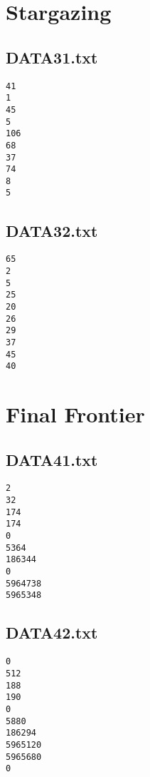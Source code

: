 \documentclass{article}
\begin{document}
\pagebreak


\section{Stargazing}

\subsection{DATA31.txt}

\begin{verbatim}
41
1
45
5
106
68
37
74
8
5
\end{verbatim}

\subsection{DATA32.txt}

\begin{verbatim}
65
2
5
25
20
26
29
37
45
40
\end{verbatim}


\pagebreak


\section{Final Frontier}

\subsection{DATA41.txt}

\begin{verbatim}
2
32
174
174
0
5364
186344
0
5964738
5965348
\end{verbatim}

\subsection{DATA42.txt}

\begin{verbatim}
0
512
188
190
0
5880
186294
5965120
5965680
0
\end{verbatim}
\end{document}
